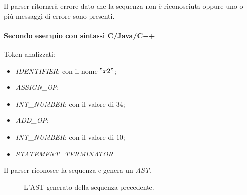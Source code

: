 Il parser ritornerà errore dato che la sequenza non è riconosciuta oppure
uno o più messaggi di errore sono presenti.


\paragraph{Secondo esempio con sintassi C/Java/C++}
Token analizzati:
\begin{itemize}
  \item \emph{IDENTIFIER}: con il nome $"x2"$;
  \item \emph{ASSIGN\_OP};
  \item \emph{INT\_NUMBER}: con il valore di $34$;
  \item \emph{ADD\_OP};
  \item \emph{INT\_NUMBER}: con il valore di $10$;
  \item \emph{STATEMENT\_TERMINATOR}.
\end{itemize}

Il parser riconosce la sequenza e genera un \emph{AST}.

\begin{figure}[ht]
    \centering
    \caption{L'AST generato della sequenza precedente.}
    \label{fig:ast-2}
\end{figure}
